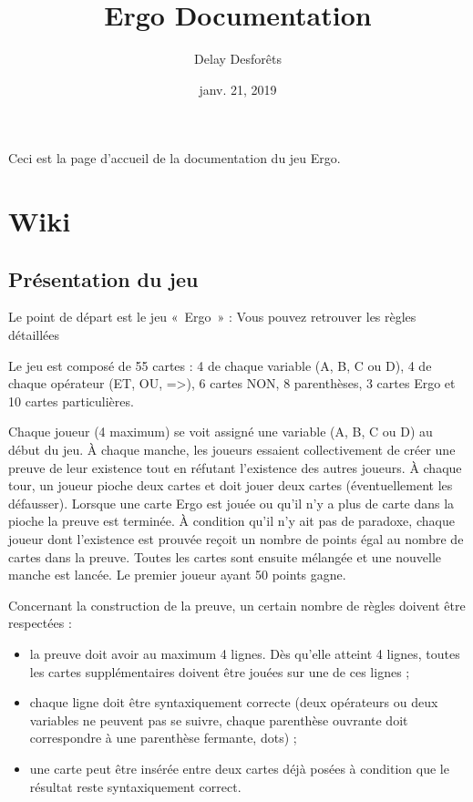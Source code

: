 \documentclass[letterpaper,10pt,french]{sphinxmanual}
\title{Ergo Documentation}
\date{janv. 21, 2019}
\author{Delay Desforêts}
\begin{document}
\maketitle
\sphinxtableofcontents
{}\label{\detokenize{index::doc}}


Ceci est la page d’accueil de la documentation du jeu Ergo.


\chapter{Wiki}
\label{\detokenize{regles::doc}}\label{\detokenize{regles:bienvenue-dans-la-documentation-du-jeu-ergo}}\label{\detokenize{regles:wiki}}

\section{Présentation du jeu}
\label{\detokenize{regles:presentation-du-jeu}}
Le point de départ est le jeu « Ergo » :  Vous pouvez retrouver les règles détaillées 

Le jeu est composé de 55 cartes : 4 de chaque variable (A, B, C ou D), 4 de chaque opérateur (ET, OU, =\textgreater{}), 6 cartes NON, 8 parenthèses, 3 cartes Ergo et 10 cartes particulières.

Chaque joueur (4 maximum) se voit assigné une variable (A, B, C ou D) au début du jeu. À chaque manche, les joueurs essaient collectivement de créer une preuve de leur existence tout en réfutant l’existence des autres joueurs. À chaque tour, un joueur pioche deux cartes et doit jouer deux cartes (éventuellement les défausser). Lorsque une carte Ergo est jouée ou qu’il n’y a plus de carte dans la pioche la preuve est terminée. À condition qu’il n’y ait pas de paradoxe, chaque joueur dont l’existence est prouvée reçoit un nombre de points égal au nombre de cartes dans la preuve. Toutes les cartes sont ensuite mélangée et une nouvelle manche est lancée. Le premier joueur ayant 50 points gagne.

Concernant la construction de la preuve, un certain nombre de règles doivent être respectées :
\begin{itemize}
\item {} 
la preuve doit avoir au maximum 4 lignes. Dès qu’elle atteint 4 lignes, toutes les cartes supplémentaires doivent être jouées sur une de ces lignes ;

\item {} 
chaque ligne doit être syntaxiquement correcte (deux opérateurs ou deux variables ne peuvent pas se suivre, chaque parenthèse ouvrante doit correspondre à une parenthèse fermante, dots) ;

\item {} 
une carte peut être insérée entre deux cartes déjà posées à condition que le résultat reste syntaxiquement correct.

\end{itemize}
\end{document}
